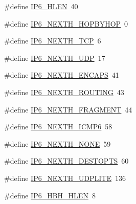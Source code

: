 \begin{DoxyCompactItemize}
\item 
\#define \hyperlink{openmote-cc2538_2lwip_2src_2include_2lwip_2prot_2ip6_8h_afb4c1dc527be76d8f27591dfb726c023}{I\+P6\+\_\+\+H\+L\+EN}~40
\item 
\#define \hyperlink{openmote-cc2538_2lwip_2src_2include_2lwip_2prot_2ip6_8h_a27db49d05c2230c085c04e766267ed38}{I\+P6\+\_\+\+N\+E\+X\+T\+H\+\_\+\+H\+O\+P\+B\+Y\+H\+OP}~0
\item 
\#define \hyperlink{openmote-cc2538_2lwip_2src_2include_2lwip_2prot_2ip6_8h_a748b24c4f1ae5bbeecaa34e066cb3f8c}{I\+P6\+\_\+\+N\+E\+X\+T\+H\+\_\+\+T\+CP}~6
\item 
\#define \hyperlink{openmote-cc2538_2lwip_2src_2include_2lwip_2prot_2ip6_8h_a0159bb5b3af8ea1e203d543c0f3c17c2}{I\+P6\+\_\+\+N\+E\+X\+T\+H\+\_\+\+U\+DP}~17
\item 
\#define \hyperlink{openmote-cc2538_2lwip_2src_2include_2lwip_2prot_2ip6_8h_a203e1cfca6330ec95bcdbe2418587f65}{I\+P6\+\_\+\+N\+E\+X\+T\+H\+\_\+\+E\+N\+C\+A\+PS}~41
\item 
\#define \hyperlink{openmote-cc2538_2lwip_2src_2include_2lwip_2prot_2ip6_8h_a4d9e6542b73b17c81b56808e1ffd5b27}{I\+P6\+\_\+\+N\+E\+X\+T\+H\+\_\+\+R\+O\+U\+T\+I\+NG}~43
\item 
\#define \hyperlink{openmote-cc2538_2lwip_2src_2include_2lwip_2prot_2ip6_8h_a1a72bdc1494ea84cbf16424e9aedcd79}{I\+P6\+\_\+\+N\+E\+X\+T\+H\+\_\+\+F\+R\+A\+G\+M\+E\+NT}~44
\item 
\#define \hyperlink{openmote-cc2538_2lwip_2src_2include_2lwip_2prot_2ip6_8h_ab277ee09b6e7200fc1cfe28482b886a6}{I\+P6\+\_\+\+N\+E\+X\+T\+H\+\_\+\+I\+C\+M\+P6}~58
\item 
\#define \hyperlink{openmote-cc2538_2lwip_2src_2include_2lwip_2prot_2ip6_8h_a654fbd4bb77707859b16f6935f2ba4c7}{I\+P6\+\_\+\+N\+E\+X\+T\+H\+\_\+\+N\+O\+NE}~59
\item 
\#define \hyperlink{openmote-cc2538_2lwip_2src_2include_2lwip_2prot_2ip6_8h_af01cb063f723d79e1c34a8e95a93a2c0}{I\+P6\+\_\+\+N\+E\+X\+T\+H\+\_\+\+D\+E\+S\+T\+O\+P\+TS}~60
\item 
\#define \hyperlink{openmote-cc2538_2lwip_2src_2include_2lwip_2prot_2ip6_8h_a6e4afde135c71a3b194b68add3d9138c}{I\+P6\+\_\+\+N\+E\+X\+T\+H\+\_\+\+U\+D\+P\+L\+I\+TE}~136
\item 
\#define \hyperlink{openmote-cc2538_2lwip_2src_2include_2lwip_2prot_2ip6_8h_a3c07dfc39f03801b78ea2b5e882feaa5}{I\+P6\+\_\+\+H\+B\+H\+\_\+\+H\+L\+EN}~8
\item 

\end{DoxyCompactItemize}
